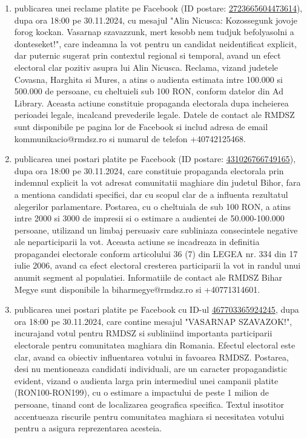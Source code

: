 \documentclass[a4paper,12pt]{article}
\begin{document}
\begin{enumerate}[leftmargin=*, label=\arabic*.)]
    \item publicarea unei reclame platite pe Facebook (ID postare: \href{https://www.facebook.com/ads/library/?id=2723665604473614}{2723665604473614}), dupa ora 18:00 pe 30.11.2024, cu mesajul "Alin Nicusca: Kozossegunk jovoje forog kockan. Vasarnap szavazzunk, mert kesobb nem tudjuk befolyasolni a donteseket!", care indeamna la vot pentru un candidat neidentificat explicit, dar puternic sugerat prin contextul regional si temporal, avand un efect electoral clar pozitiv asupra lui Alin Nicusca.  Reclama, vizand judetele Covasna, Harghita si Mures, a atins o audienta estimata intre 100.000 si 500.000 de persoane, cu cheltuieli sub 100 RON, conform datelor din Ad Library.  Aceasta actiune constituie propaganda electorala dupa incheierea perioadei legale, incalcand prevederile legale.  Datele de contact ale RMDSZ sunt disponibile pe pagina lor de Facebook si includ adresa de email kommunikacio@rmdsz.ro si numarul de telefon +40742125468.
    \item publicarea unei postari platite pe Facebook (ID postare: \href{https://www.facebook.com/ads/library/?id=431026766749165}{431026766749165}), dupa ora 18:00 pe 30.11.2024, care constituie propaganda electorala prin indemnul explicit la vot adresat comunitatii maghiare din judetul Bihor, fara a mentiona candidati specifici, dar cu scopul clar de a influenta rezultatul alegerilor parlamentare.  Postarea, cu o cheltuiala de sub 100 RON, a atins intre 2000 si 3000 de impresii si o estimare a audientei de 50.000-100.000 persoane, utilizand un limbaj persuasiv care subliniaza consecintele negative ale neparticiparii la vot.  Aceasta actiune se incadreaza in definitia propagandei electorale conform articolului 36 (7) din LEGEA nr. 334 din 17 iulie 2006, avand ca efect electoral cresterea participarii la vot in randul unui anumit segment al populatiei.  Informatiile de contact ale RMDSZ Bihar Megye sunt disponibile la biharmegye@rmdsz.ro si +40771314601.
    \item publicarea unei postari platite pe Facebook cu ID-ul \href{https://www.facebook.com/ads/library/?id=467703365924245}{467703365924245}, dupa ora 18:00 pe 30.11.2024, care contine mesajul "VASARNAP SZAVAZOK!",  incurajand votul pentru RMDSZ si subliniind importanta participarii electorale pentru comunitatea maghiara din Romania.  Efectul electoral este clar, avand ca obiectiv influentarea votului in favoarea RMDSZ.  Postarea, desi nu mentioneaza candidati individuali, are un caracter propagandistic evident, vizand o audienta larga prin intermediul unei campanii platite (RON100-RON199), cu o estimare a impactului de peste 1 milion de persoane, tinand cont de localizarea geografica specifica.  Textul insotitor accentueaza riscurile pentru comunitatea maghiara si necesitatea votului pentru a asigura reprezentarea acesteia.

\end{enumerate}
\end{document}
